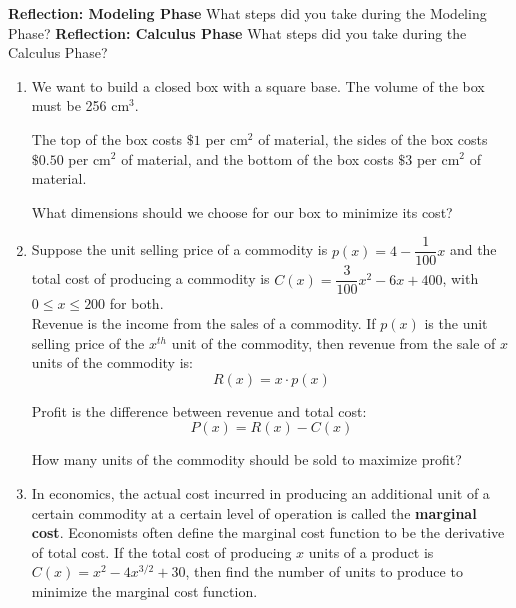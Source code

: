 \documentclass[10pt]{article}
\begin{document}
\vfill


\newpage%
{\bf Reflection: Modeling Phase} What steps did you take during the Modeling Phase? 
\vfill
{\bf Reflection: Calculus Phase} What steps did you take during the Calculus Phase? 
\vfill


\newpage

\begin{enumerate}

\LARGE \item We want to build a closed box with a square base. The volume of the box must be 256 cm$^3$. 

The top of the box costs $\$1$ per cm$^2$ of material, the sides of the box costs $\$0.50$ per cm$^2$ of material, and the bottom of the box costs $\$3$ per cm$^2$ of material. 

What dimensions should we choose for our box to minimize its cost?\\




\newpage%

\item Suppose the unit selling price of a commodity is $p(x)=4-\dfrac1{100}x$ and the total cost of producing a commodity is $C(x)=\dfrac{3}{100}x^2-6x+400$, with $0\leq x\leq 200$ for both.\\

Revenue is the income from the sales of a commodity. If $p(x)$ is the unit selling price of the $x^{th}$ unit of the commodity, then revenue from the sale of $x$ units of the commodity is: \[R(x)=x\cdot p(x)\]

Profit is the difference between revenue and total cost:
\[P(x) = R(x) - C(x)\]

How many units of the commodity should be sold to maximize profit?


\vfill


\newpage%

\item In economics, the actual cost incurred in producing an additional unit of a certain commodity at a certain level of operation is called the {\bf marginal cost}. Economists often define the marginal cost function to be the derivative of total cost. If the total cost of producing $x$ units of a product is $C(x)=x^2-4x^{3/2}+30$, then find the number of units to produce to minimize the marginal cost function.


\end{enumerate}
\end{document}
